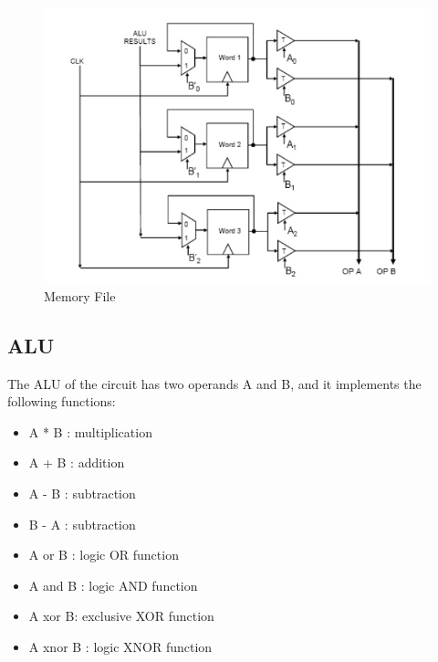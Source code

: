 \documentclass[12pt]{article}
\begin{document}
\begin{figure}[H]
	\centering
	\includegraphics[width=0.7\linewidth]{memory-file}
	\caption{Memory File}
	\label{fig:memory-file}
\end{figure}
\subsection{ALU}
The ALU of the circuit has two operands A and B, and it implements the following functions:
\begin{itemize}
	\item A * B : multiplication
	\item A + B : addition
	\item A - B : subtraction
	\item B - A : subtraction
	\item A or B : logic OR function
	\item A and B : logic AND function
	\item A xor B: exclusive XOR function
	\item A xnor B : logic XNOR function
\end{itemize}
\end{document}
